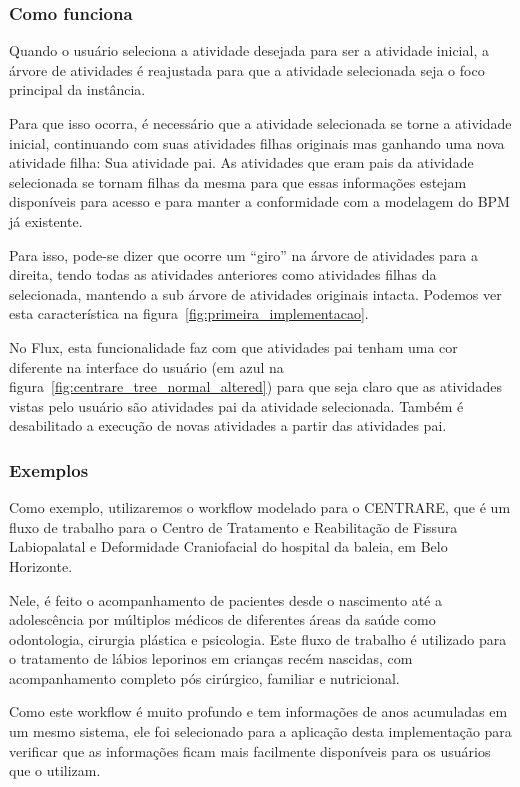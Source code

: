 \subsubsection{Como funciona}

Quando o usuário seleciona a atividade desejada para ser a atividade inicial, a árvore de atividades é reajustada para que a atividade selecionada seja o foco principal da instância.

Para que isso ocorra, é necessário que a atividade selecionada se torne a atividade inicial, continuando com suas atividades filhas originais mas ganhando uma nova atividade filha: Sua atividade pai. As atividades que eram pais da atividade selecionada se tornam filhas da mesma para que essas informações estejam disponíveis para acesso e para manter a conformidade com a modelagem do BPM já existente.

Para isso, pode-se dizer que ocorre um ``giro'' na árvore de atividades para a direita, tendo todas as atividades anteriores como atividades filhas da selecionada, mantendo a sub árvore de atividades originais intacta. Podemos ver esta característica na figura~\ref{fig:primeira_implementacao}.

No Flux, esta funcionalidade faz com que atividades pai tenham uma cor diferente na interface do usuário (em azul na figura~\ref{fig:centrare_tree_normal_altered}) para que seja claro que as atividades vistas pelo usuário são atividades pai da atividade selecionada. Também é desabilitado a execução de novas atividades a partir das atividades pai.

\subsubsection{Exemplos} \label{sec:dinamic_workflows_examples}

Como exemplo, utilizaremos o workflow modelado para o CENTRARE, que é um fluxo de trabalho para o Centro de Tratamento e Reabilitação de Fissura Labiopalatal e Deformidade Craniofacial do hospital da baleia, em Belo Horizonte.

Nele, é feito o acompanhamento de pacientes desde o nascimento até a adolescência por múltiplos médicos de diferentes áreas da saúde como odontologia, cirurgia plástica e psicologia. Este fluxo de trabalho é utilizado para o tratamento de lábios leporinos em crianças recém nascidas, com acompanhamento completo pós cirúrgico, familiar e nutricional.

Como este workflow é muito profundo e tem informações de anos acumuladas em um mesmo sistema, ele foi selecionado para a aplicação desta implementação para verificar que as informações ficam mais facilmente disponíveis para os usuários que o utilizam.

